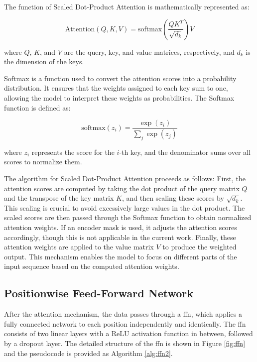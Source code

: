 The function of Scaled Dot-Product Attention is mathematically represented as:

\begin{equation}
\text{Attention}(Q, K, V) = \text{softmax}\left(\frac{QK^T}{\sqrt{d_k}}\right)V
\end{equation}

where $Q$, $K$, and $V$ are the query, key, and value matrices, respectively, and $d_k$ is the dimension of the keys.

Softmax is a function used to convert the attention scores into a probability distribution. It ensures that the weights assigned to each key sum to one, allowing the model to interpret these weights as probabilities. The Softmax function is defined as:

\begin{equation}
\text{softmax}(z_i) = \frac{\exp(z_i)}{\sum_{j} \exp(z_j)}
\end{equation}

where \( z_i \) represents the score for the \( i \)-th key, and the denominator sums over all scores to normalize them.

The algorithm for Scaled Dot-Product Attention proceeds as follows: First, the attention scores are computed by taking the dot product of the query matrix $Q$ and the transpose of the key matrix $K$, and then scaling these scores by \( \sqrt{d_k} \). This scaling is crucial to avoid excessively large values in the dot product. The scaled scores are then passed through the Softmax function to obtain normalized attention weights. If an encoder mask is used, it adjusts the attention scores accordingly, though this is not applicable in the current work. Finally, these attention weights are applied to the value matrix $V$ to produce the weighted output. This mechanism enables the model to focus on different parts of the input sequence based on the computed attention weights.


\subsection{Positionwise Feed-Forward Network}
\label{sec:ffn}
After the attention mechanism, the data passes through a \gls{ffn}, which applies a fully connected network to each position independently and identically. The \gls{ffn} consists of two linear layers with a ReLU activation function in between, followed by a dropout layer. The detailed structure of the \gls{ffn} is shown in Figure \ref{fig:ffn} and the pseudocode is provided as Algorithm \ref{alg:ffn2}.

